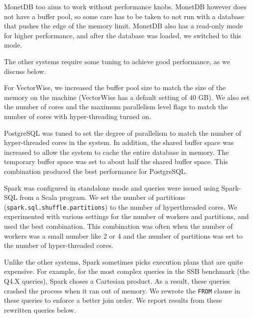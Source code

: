 MonetDB too aims to work without performance knobs. MonetDB however does not have a buffer pool, so some care has to be taken to not run with a database that pushes the edge of the memory limit. MonetDB also has a read-only mode for higher performance, and after the database was loaded, we switched to this mode.

The other systems require some tuning to achieve good performance, as we discuss below.

For VectorWise, we increased the buffer pool size to match the size of the memory on the machine (VectorWise has a default setting of 40 GB). We also set the number of cores and the maximum parallelism level flags to match the number of cores with hyper-threading turned on.

PostgreSQL was tuned to set the degree of parallelism to match the number of hyper-threaded cores in the system. In addition, the shared buffer space was increased to allow the system to cache the entire database in memory. The temporary buffer space was set to about half the shared buffer space. %
This combination produced the best performance for PostgreSQL. %

Spark was configured in standalone mode and queries were issued using Spark-SQL from a Scala program. %
We set the number of partitions (\texttt{spark.sql.shuffle.partitions}) to the number of hyperthreaded cores. We experimented with various settings for the number of workers and partitions, and used the best combination. This combination was often when the number of workers was a small number like 2 or 4 and the number of partitions was set to the number of hyper-threaded cores. %

Unlike the other systems, Spark sometimes picks execution plans that are quite expensive. For example, for the most complex queries in the SSB benchmark (the Q4.X queries), Spark choses a Cartesian product. As a result, these queries crashed the process when it ran out of memory. We rewrote the \texttt{FROM} clause in these queries to enforce a better join order. We report results from these rewritten queries below.

